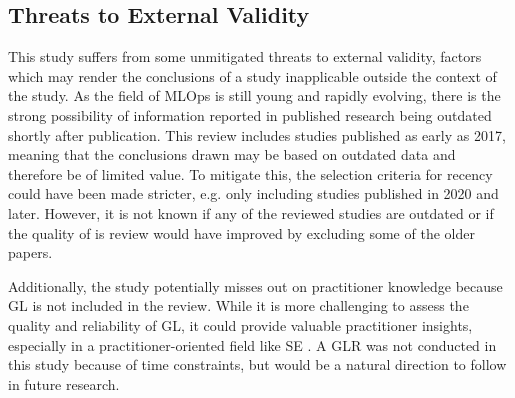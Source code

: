 \subsection{Threats to External Validity}
This study suffers from some unmitigated threats to external validity, factors which may render the conclusions of a study inapplicable outside the context of the study.
As the field of MLOps is still young and rapidly evolving, there is the strong possibility of information reported in published research being outdated shortly after publication.
This review includes studies published as early as 2017, meaning that the conclusions drawn may be based on outdated data and therefore be of limited value.
To mitigate this, the selection criteria for recency could have been made stricter, e.g. only including studies published in 2020 and later.
However, it is not known if any of the reviewed studies are outdated or if the quality of is review would have improved by excluding some of the older papers.

Additionally, the study potentially misses out on practitioner knowledge because GL is not included in the review.
While it is more challenging to assess the quality and reliability of GL, it could provide valuable practitioner insights, especially in a practitioner-oriented field like SE \cite{Garousi2016}.
A GLR was not conducted in this study because of time constraints, but would be a natural direction to follow in future research.

